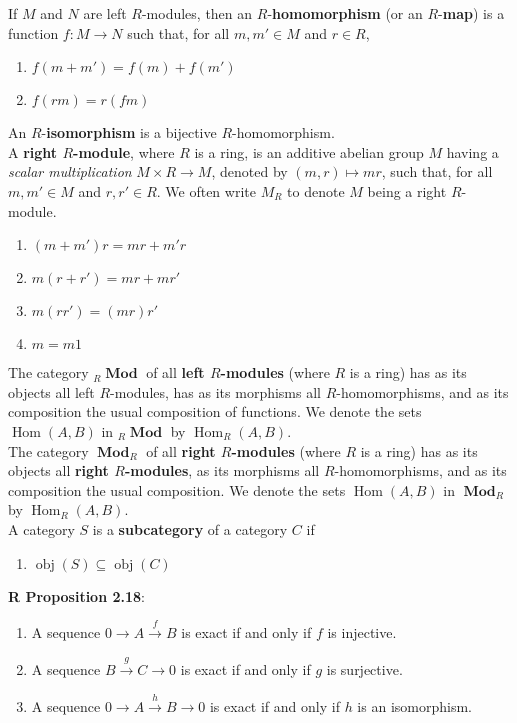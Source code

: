 \documentclass[8pt]{amsart}
\theoremstyle{plain}%
\theoremstyle{definition}
\theoremstyle{remark}
\numberwithin{equation}{section}
\newcommand{\obj}{\operatorname{obj}}
\newcommand{\Hom}{\operatorname{Hom}}
\newcommand{\Mod}{\operatorname{\textbf{Mod}}}
\begin{document}
If $M$ and $N$ are left $R$-modules, then an $R$-\textbf{homomorphism} (or an $R$-\textbf{map}) is a function $f : M \to N$ such that, for all $m, m' \in M$ and $r \in R$,
	\begin{enumerate}
		\item $f(m + m') = f(m) + f(m')$
		\item $f(rm) = r(fm)$\\
	\end{enumerate}

An $R$-\textbf{isomorphism} is a bijective $R$-homomorphism.\\

A \textbf{right $R$-module}, where $R$ is a ring, is an additive abelian group $M$ having a \textit{scalar multiplication} $M \times R \to M$, denoted by $(m, r) \mapsto mr$, such that, for all $m, m' \in M$ and $r, r' \in R$. We often write $M_R$ to denote $M$ being a right $R$-module.
	\begin{enumerate}
		\item $(m + m')r = mr + m'r$
		\item $m(r + r') = mr + mr'$
		\item $m(rr') = (mr)r'$
		\item $m = m1$\\
	\end{enumerate}

The category $_R\Mod$ of all \textbf{left $R$-modules} (where $R$ is a ring) has as its objects all left $R$-modules, has as its morphisms all $R$-homomorphisms, and as its composition the usual composition of functions. We denote the sets $\Hom(A, B)$ in $_R\Mod$ by $\Hom_R(A, B)$.\\

The category $\Mod_R$ of all \textbf{right $R$-modules} (where $R$ is a ring) has as its objects all \textbf{right $R$-modules}, as its morphisms all $R$-homomorphisms, and as its composition the usual composition. We denote the sets $\Hom(A, B)$ in $\Mod_R$ by $\Hom_R(A, B)$.\\

A category $S$ is a \textbf{subcategory} of a category $C$ if
	\begin{enumerate}
		\item $\obj(S) \subseteq \obj(C)$
	\end{enumerate}


\textbf{R Proposition 2.18}:
	\begin{enumerate}
		\item A sequence $0 \rightarrow A \xrightarrow{f} B$ is exact if and only if $f$ is injective.
		\item A sequence $B \xrightarrow g C \rightarrow 0$ is exact if and only if $g$ is surjective.
		\item A sequence $0 \rightarrow A \xrightarrow{h} B \rightarrow 0$ is exact if and only if $h$ is an isomorphism.
	\end{enumerate}
\end{document}
